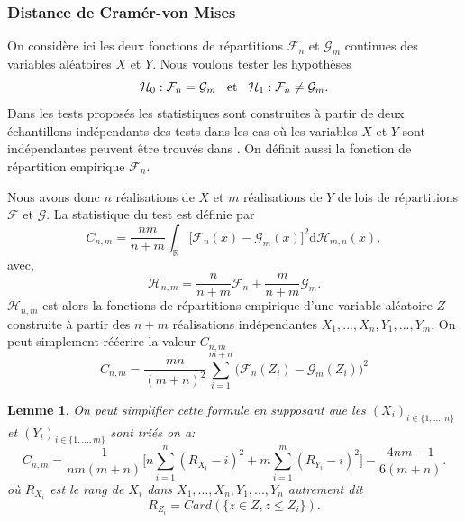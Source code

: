 \documentclass[a4paper,11pt]{article}
\newtheorem{lemma}{Lemme}
\begin{document}
\subsubsection{Distance de Cramér-von Mises}
\label{ch:Cv-M}
On considère ici les deux fonctions de répartitions $\mathcal{F}_{n}$ et $\mathcal{G}_{m}$ continues des variables aléatoires $X$ et $Y$. Nous voulons tester les hypothèses
\begin{equation*}
	\mathcal{H}_0 : \mathcal{F}_{n} = \mathcal{G}_{m} \hspace{3mm}\textrm{et}\hspace{3mm} \mathcal{H}_1 : \mathcal{F}_{n} \neq \mathcal{G}_{m}.
\end{equation*}
Dans les tests proposés les statistiques sont construites à partir de deux échantillons indépendants des tests dans les cas où les variables $X$ et $Y$ sont indépendantes peuvent être trouvés dans \cite{ethier2011propos}. On définit aussi la fonction de répartition empirique $\mathcal{F}_n$.

Nous avons donc $n$ réalisations de $X$ et $m$ réalisations de $Y$ de lois de répartitions $\mathcal{F}$ et $\mathcal{G}$.
La statistique du test est définie par
\begin{equation}
	C_{n,m}=\frac{nm}{n+m}\int_{\mathbb{R}}\big[ \mathcal{F}_{n}(x)-\mathcal{G}_{m}(x)\big]^{2} \mathrm{d} \mathcal{H}_{m,n}(x),
\end{equation}
avec,
\begin{equation}
	\mathcal{H}_{n,m}=\frac{n}{n+m}\mathcal{F}_n+\frac{m}{n+m}\mathcal{G}_m.
\end{equation}
$\mathcal{H}_{n,m}$ est alors la fonctions de répartitions empirique d'une variable aléatoire $Z$ construite à partir des $n+m$ réalisations indépendantes $X_1,...,X_n,Y_1,...,Y_m$. On peut simplement réécrire la valeur $C_{n,m}$
\begin{equation}
	C_{n,m}=\frac{mn}{(m+n)^2}\sum_{i=1}^{m+n}\big(\mathcal{F}_n(Z_i)-\mathcal{G}_{m}(Z_i)\big)^2
\end{equation}

\begin{lemma}
	\label{C-v}
	On peut simplifier cette formule en supposant que les $(X_i)_{i\in \{1,...,n\}}$ et $(Y_i)_{i\in \{1,...,m\}}$ sont triés on a:
	\begin{equation}
		C_{n,m}=\frac{1}{nm(m+n)}\Big[ n\sum_{i=1}^{n}(R_{X_i}-i)^2+ m\sum_{i=1}^{m}(R_{Y_i}-i)^2\Big]-\frac{4nm-1}{6(m+n)}.
	\end{equation}
	où $R_{X_i}$ est le rang de $X_i$ dans $X_1,...,X_n,Y_1,...,Y_n$ autrement dit 
	\[R_{Z_i}=Card(\{z\in Z, z\leq Z_i\}).\] 
\end{lemma}
\end{document}

